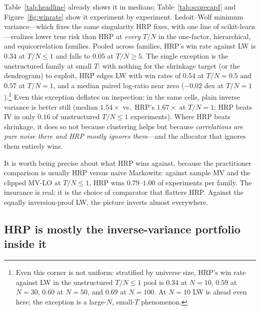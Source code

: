 \documentclass[11pt]{article}
\newcommand{\TN}{T/N}
\begin{document}
Table~\ref{tab:headline} already shows it in medians; Table~\ref{tab:scorecard}
and Figure~\ref{fig:winrate} show it experiment by experiment. Ledoit--Wolf
minimum variance---which fixes the same singularity HRP fixes, with one line
of scikit-learn---realizes lower true risk than HRP at \emph{every} $\TN$ in
the one-factor, hierarchical, and equicorrelation families. Pooled across
families, HRP's win rate against LW is $0.34$ at $\TN\le1$ and falls to
$0.05$ at $\TN\ge5$. The single exception is the unstructured family at
small $T$: with nothing for the shrinkage target (or the dendrogram) to
exploit, HRP edges LW with win rates of $0.54$ at $\TN=0.5$ and $0.57$ at
$\TN=1$, and a median paired log-ratio near zero ($-0.02$ dex at
$\TN=1$).\footnote{Even this corner is not uniform: stratified by universe
size, HRP's win rate against LW in the unstructured $\TN\le1$ pool is
$0.34$ at $N=10$, $0.59$ at $N=30$, $0.60$ at $N=50$, and $0.69$ at
$N=100$. At $N=10$ LW is ahead even here; the exception is a large-$N$,
small-$T$ phenomenon.}
Even this
exception deflates on inspection: in the same cells, plain inverse variance
is better still (median $1.54\times$ vs.\ HRP's $1.67\times$ at $\TN=1$; HRP
beats IV in only $0.16$ of unstructured $\TN\le1$ experiments). Where HRP
beats shrinkage, it does so not because clustering helps but because
\emph{correlations are pure noise there and HRP mostly ignores them}---and
the allocator that ignores them entirely wins.

It is worth being precise about what HRP wins against, because the
practitioner comparison is usually HRP versus naive Markowitz: against
sample MV and the clipped MV-LO at $\TN\le1$, HRP wins $0.79$--$1.00$ of
experiments per family. The insurance is real; it is the choice of
comparator that flatters HRP. Against the equally inversion-proof
LW, the picture inverts almost everywhere.

\subsection{HRP is mostly the inverse-variance portfolio inside it}
\label{sec:ivp}
\end{document}
